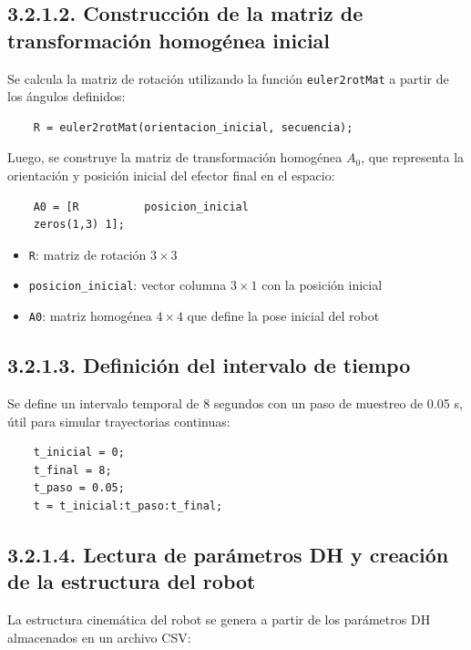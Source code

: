 \subsection*{3.2.1.2. Construcción de la matriz de transformación homogénea inicial}

Se calcula la matriz de rotación utilizando la función \texttt{euler2rotMat} a partir de los ángulos definidos:

\begin{verbatim}
	R = euler2rotMat(orientacion_inicial, secuencia);
\end{verbatim}

Luego, se construye la matriz de transformación homogénea \( A_0 \), que representa la orientación y posición inicial del efector final en el espacio:

\begin{verbatim}
	A0 = [R          posicion_inicial
	zeros(1,3) 1];
\end{verbatim}

\begin{itemize}
	\item \texttt{R}: matriz de rotación \(3 \times 3\)
	\item \texttt{posicion\_inicial}: vector columna \(3 \times 1\) con la posición inicial
	\item \texttt{A0}: matriz homogénea \(4 \times 4\) que define la pose inicial del robot
\end{itemize}

\subsection*{3.2.1.3. Definición del intervalo de tiempo}

Se define un intervalo temporal de 8 segundos con un paso de muestreo de 0.05 s, útil para simular trayectorias continuas:

\begin{verbatim}
	t_inicial = 0;
	t_final = 8;
	t_paso = 0.05;
	t = t_inicial:t_paso:t_final;
\end{verbatim}

\subsection*{3.2.1.4. Lectura de parámetros DH y creación de la estructura del robot}

La estructura cinemática del robot se genera a partir de los parámetros DH almacenados en un archivo CSV:

